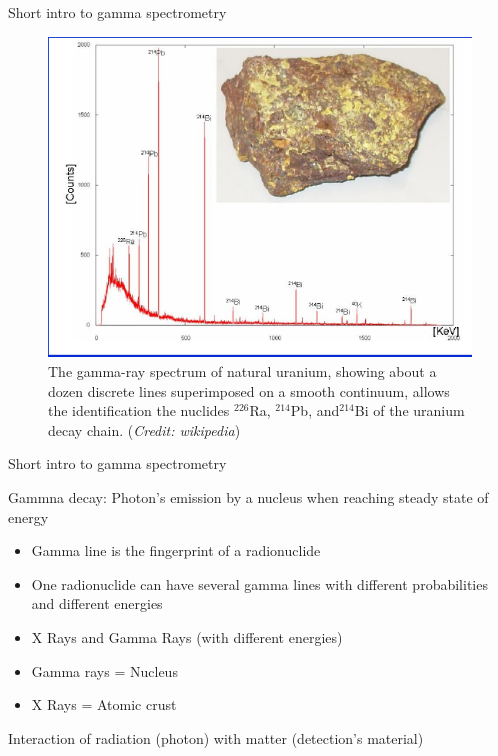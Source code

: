 \begin{frame}{Short intro to gamma spectrometry}


\begin{figure}
\centering
\includegraphics[scale=0.4]{figures/pechblenda.png}
\caption*{The gamma-ray spectrum of natural uranium, showing about a dozen discrete lines superimposed on a smooth continuum, allows the identification the nuclides $^{226}$Ra, $^{214}$Pb, and$^{214}$Bi of the uranium decay chain. (\emph{Credit: wikipedia})}
\end{figure}


\end{frame}

\begin{frame}{Short intro to gamma spectrometry}

\alert{Gammna decay: Photon’s emission by a nucleus when reaching steady state of energy}

\begin{exampleblock}{}

\begin{itemize}
	\item Gamma line is the fingerprint of a radionuclide 
	\item One radionuclide can have several gamma lines with different probabilities and different energies 
	\item X Rays and Gamma Rays (with different energies) 
	\item Gamma rays = Nucleus 
	\item X Rays = Atomic crust
\end{itemize}

\end{exampleblock}

\pause
\begin{block}{}
\centering Interaction of radiation (photon) with matter (detection’s material)
\end{block}

\end{frame}

